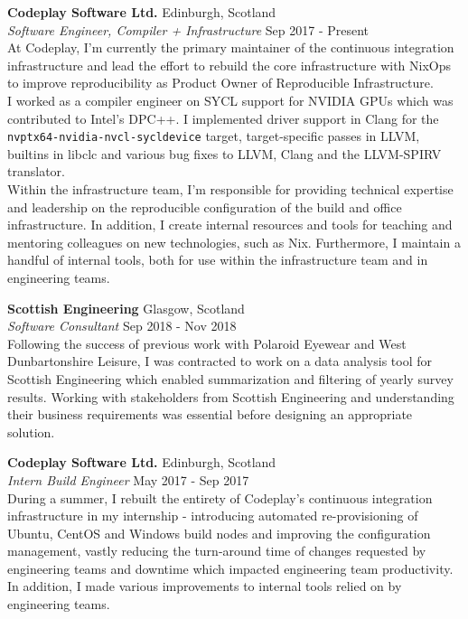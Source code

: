 \documentclass[a4paper]{article}
\begin{document}
\textbf{Codeplay Software Ltd.} \hfill {\color{gray} Edinburgh, Scotland} \\
\textit{Software Engineer, Compiler + Infrastructure} \hfill {\color{gray} Sep 2017 - Present} \\
\vspace{2mm}
At Codeplay, I'm currently the primary maintainer of the continuous integration infrastructure and
lead the effort to rebuild the core infrastructure with NixOps to improve reproducibility as Product
Owner of Reproducible Infrastructure. \\
\vspace{2mm}
I worked as a compiler engineer on SYCL support for NVIDIA GPUs which was contributed to Intel's
DPC++. I implemented driver support in Clang for the \verb|nvptx64-nvidia-nvcl-sycldevice| target,
target-specific passes in LLVM, builtins in libclc and various bug fixes to LLVM, Clang and the
LLVM-SPIRV translator. \\
\vspace{2mm}
Within the infrastructure team, I'm responsible for providing technical expertise and leadership on
the reproducible configuration of the build and office infrastructure. In addition, I create
internal resources and tools for teaching and mentoring colleagues on new technologies, such as Nix.
Furthermore, I maintain a handful of internal tools, both for use within the infrastructure
team and in engineering teams. \\
\vspace{2mm}

\textbf{Scottish Engineering} \hfill {\color{gray} Glasgow, Scotland} \\
\textit{Software Consultant} \hfill {\color{gray} Sep 2018 - Nov 2018} \\
\vspace{2mm}
Following the success of previous work with Polaroid Eyewear and West Dunbartonshire Leisure, I
was contracted to work on a data analysis tool for Scottish Engineering which enabled summarization
and filtering of yearly survey results. Working with stakeholders from Scottish Engineering and
understanding their business requirements was essential before designing an appropriate solution.
\vspace{2mm}

\textbf{Codeplay Software Ltd.} \hfill {\color{gray} Edinburgh, Scotland} \\
\textit{Intern Build Engineer} \hfill {\color{gray} May 2017 - Sep 2017} \\
\vspace{2mm}
During a summer, I rebuilt the entirety of Codeplay's continuous integration infrastructure
in my internship - introducing automated re-provisioning of Ubuntu, CentOS and Windows build nodes
and improving the configuration management, vastly reducing the turn-around time of changes
requested by engineering teams and downtime which impacted engineering team productivity. In
addition, I made various improvements to internal tools relied on by engineering teams.
\vspace{2mm}
\end{document}

